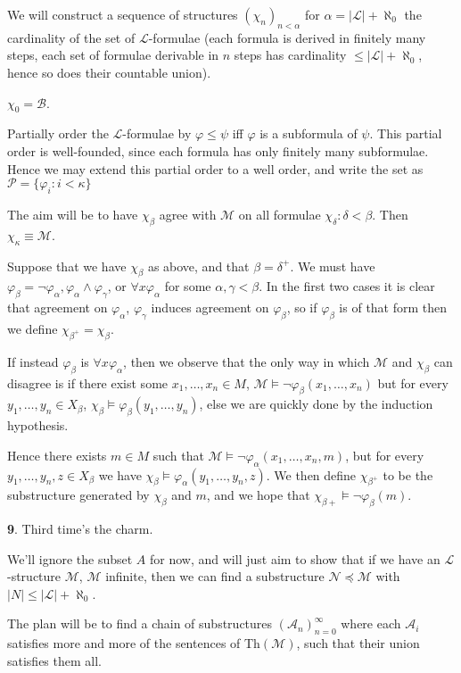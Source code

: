 \documentclass[]{article}
\theoremstyle{custhm}
\theoremstyle{cusdef}
\theoremstyle{custhm}
\theoremstyle{custhm}
\theoremstyle{custhm}
\theoremstyle{custhm}
\theoremstyle{cusdef}
\theoremstyle{remark}
\newcommand{\N}{\mathcal{N}}
\renewcommand{\L}{\mathcal{L}}
\newcommand{\M}{\mathcal{M}}
\renewcommand{\phi}{\varphi}
\newcommand{\A}{\mathcal{A}}
\begin{document}
We will construct a sequence of structures $(\chi_n)_{n<\alpha}$ for $\alpha = |\L| + \aleph_0$ the cardinality of the set of $\L$-formulae (each formula is derived in finitely many steps, each set of formulae derivable in $n$ steps has cardinality $\le |\L| + \aleph_0$, hence so does their countable union).

$\chi_0 = \mathcal{B}$.

Partially order the $\L$-formulae by $\phi \le \psi$ iff $\phi$ is a subformula of $\psi$. This partial order is well-founded, since each formula has only finitely many subformulae. Hence we may extend this partial order to a well order, and write the set as $\mathcal{P} = \{\phi_i: i<\kappa\}$

The aim will be to have $\chi_\beta$ agree with $\M$ on all formulae $\chi_\delta: \delta < \beta$. Then $\chi_\kappa \equiv \M$.

Suppose that we have $\chi_\beta$ as above, and that $\beta = \delta^+$. We must have $\phi_\beta = \neg\phi_\alpha,\phi_\alpha\land\phi_\gamma$, or $\forall x\phi_\alpha$ for some $\alpha,\gamma < \beta$. In the first two cases it is clear that agreement on $\phi_\alpha$, $\phi_\gamma$ induces agreement on $\phi_\beta$, so if $\phi_\beta$ is of that form then we define $\chi_{\beta^+} = \chi_\beta$.

If instead $\phi_\beta$ is $\forall x \phi_\alpha$, then we observe that the only way in which $\M$ and $\chi_\beta$ can disagree is if there exist some $x_1,\dots,x_n\in M$, $\M\models \neg \phi_\beta(x_1,\dots,x_n)$ but for every $y_1,\dots,y_n\in  X_\beta$, $\chi_\beta \models \phi_\beta(y_1,\dots,y_n)$, else we are quickly done by the induction hypothesis.

Hence there exists $m\in M $ such that $\M\models\neg\phi_\alpha(x_1,\dots,x_n,m)$, but for every $y_1,\dots,y_n,z \in X_\beta$ we have $\chi_\beta\models \phi_\alpha(y_1,\dots,y_n,z)$. We then define $\chi_{\beta^+} $ to be the substructure generated by $\chi_\beta$ and $m$, and we hope that $\chi_{\beta+}\models \neg \phi_\beta(m)$.

\textbf{9}. Third time's the charm.

We'll ignore the subset $A$ for now, and will just aim to show that if we have an $\L$-structure $\M$, $\M$ infinite, then we can find a substructure $\N \preceq \M$ with $|N|\le |\L| +\aleph_0$.

The plan will be to find a chain of substructures $(\A_n)_{n=0}^{\infty}$ where each $\A_i$ satisfies more and more of the sentences of Th$(\M)$, such that their union satisfies them all.
\end{document}
